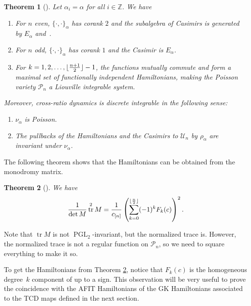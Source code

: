 \documentclass[pdftex]{sigma}
\numberwithin{equation}{section}
\newtheorem{Theorem}{Theorem}[section]
\DeclarePairedDelimiter\floor{\lfloor}{\rfloor}
\newcommand{\Z}{{\mathbb Z}}
\newcommand{\PGL}{\operatorname{PGL}}
\newcommand{\la}{\label}
\DeclareMathOperator{\tr}{tr}
\begin{document}
\begin{Theorem}[] %
		Let $\alpha_i=\alpha$ for all $i \in \Z$. We have
		\begin{enumerate}\itemsep=0pt
			\item[$1.$] For $n$ even, $\{\cdot,\cdot \}_{ \alpha}$ has corank $2$ and the subalgebra of Casimirs is generated by $E_{\alpha}$ and~.
			\item[$2.$] For $n$ odd, $\{\cdot,\cdot \}_{ \alpha}$ has corank $1$ and the Casimir is $E_{\alpha}$.
			\item[$3.$] For $k=1,2,\dots, \floor{\frac{n+1}{2}} -1$, the functions  mutually commute and form a maximal set of functionally independent Hamiltonians, making the Poisson variety $\mathcal P_n$ a Liouville integrable system.
		\end{enumerate}
		Moreover, cross-ratio dynamics is discrete integrable in the following sense:
		\begin{enumerate}\itemsep=0pt
			\item[$4.$] $\nu_{\alpha}$ is Poisson.
			\item[$5.$] The pullbacks of the Hamiltonians and the Casimirs to $\mathcal U_n$ by $\rho_{\alpha}$ are invariant under $\nu_{\alpha}$.
		\end{enumerate}
	\end{Theorem}
	
	The following theorem shows that the Hamiltonians can be obtained from the monodromy matrix.
	\begin{Theorem}[] \la{thm:afit2}
		We have
		\[
		\frac{1}{\det M}\tr^2 M= \frac{1}{c_{[n]}}\left(\sum_{k=0}^{\floor{\frac n 2}} (-1)^k F_k(c)\right)^2.
		\]
	\end{Theorem}
	
	\begin{Remark}
		Note that $\tr M$ is not $\PGL_2$-invariant, but the normalized trace \smash{$\frac{\tr M}{{\sqrt{\det M}}}$} is. However, the normalized trace is not a regular function on $\mathcal P_n$, so we need to square everything to make it so.
	\end{Remark}
	
To get the Hamiltonians from Theorem \ref{thm:afit2}, notice that $F_k(c)$ is the homogeneous degree~$k$ component of \smash{\raisebox{1pt}{$\sqrt{c_{[n]}} \frac{\tr M}{\sqrt{\det M}}$}} up to a sign. This observation will be very useful to prove the coincidence with the AFIT Hamiltonians of the GK Hamiltonians associated to the TCD maps defined in the next section.
\end{document}
